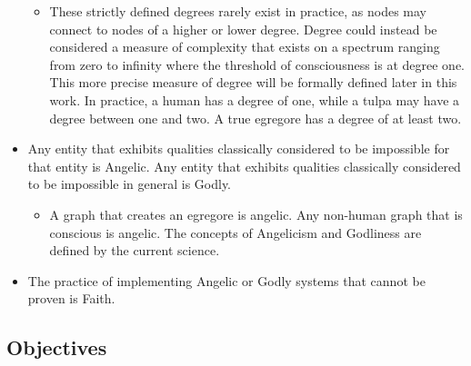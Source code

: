 \documentclass[12pt, letterpaper]{article}
\begin{document}
\begin{itemize}
    \begin{itemize}
        \item These strictly defined degrees rarely exist in practice, as nodes may connect to nodes of a higher or lower degree. Degree could instead be considered a measure of complexity that exists on a spectrum ranging from zero to infinity where the threshold of consciousness is at degree one. This more precise measure of degree will be formally defined later in this work.  In practice, a human has a degree of one, while a tulpa may have a degree between one and two. A true egregore has a degree of at least two.
    \end{itemize}
    \item Any entity that exhibits qualities classically considered to be impossible for that entity is Angelic. Any entity that exhibits qualities classically considered to be impossible in general is Godly.
    \begin{itemize}
        \item A graph that creates an egregore is angelic. Any non-human graph that is conscious is angelic. The concepts of Angelicism and Godliness are defined by the current science.
    \end{itemize}
    \item The practice of implementing Angelic or Godly systems that cannot be proven is Faith.
\end{itemize}

\subsection{Objectives}
\end{document}
